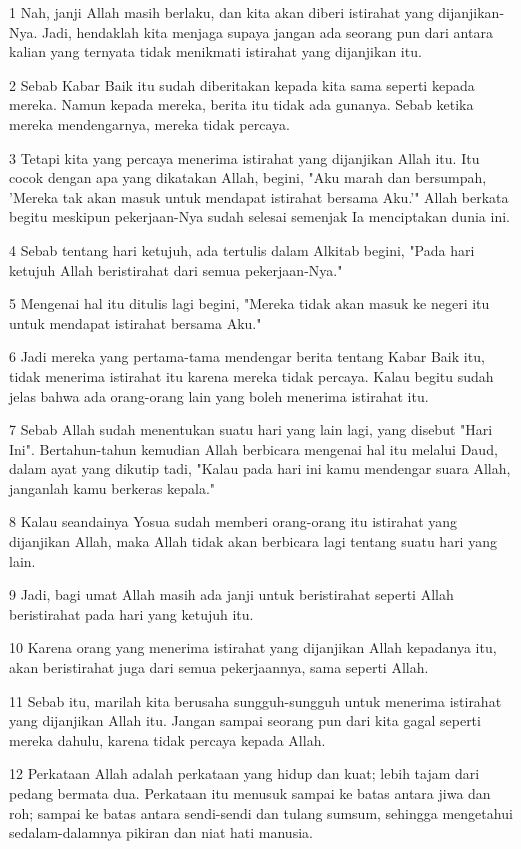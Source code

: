 \par 1 Nah, janji Allah masih berlaku, dan kita akan diberi istirahat yang dijanjikan-Nya. Jadi, hendaklah kita menjaga supaya jangan ada seorang pun dari antara kalian yang ternyata tidak menikmati istirahat yang dijanjikan itu.
\par 2 Sebab Kabar Baik itu sudah diberitakan kepada kita sama seperti kepada mereka. Namun kepada mereka, berita itu tidak ada gunanya. Sebab ketika mereka mendengarnya, mereka tidak percaya.
\par 3 Tetapi kita yang percaya menerima istirahat yang dijanjikan Allah itu. Itu cocok dengan apa yang dikatakan Allah, begini, "Aku marah dan bersumpah, 'Mereka tak akan masuk untuk mendapat istirahat bersama Aku.'" Allah berkata begitu meskipun pekerjaan-Nya sudah selesai semenjak Ia menciptakan dunia ini.
\par 4 Sebab tentang hari ketujuh, ada tertulis dalam Alkitab begini, "Pada hari ketujuh Allah beristirahat dari semua pekerjaan-Nya."
\par 5 Mengenai hal itu ditulis lagi begini, "Mereka tidak akan masuk ke negeri itu untuk mendapat istirahat bersama Aku."
\par 6 Jadi mereka yang pertama-tama mendengar berita tentang Kabar Baik itu, tidak menerima istirahat itu karena mereka tidak percaya. Kalau begitu sudah jelas bahwa ada orang-orang lain yang boleh menerima istirahat itu.
\par 7 Sebab Allah sudah menentukan suatu hari yang lain lagi, yang disebut "Hari Ini". Bertahun-tahun kemudian Allah berbicara mengenai hal itu melalui Daud, dalam ayat yang dikutip tadi, "Kalau pada hari ini kamu mendengar suara Allah, janganlah kamu berkeras kepala."
\par 8 Kalau seandainya Yosua sudah memberi orang-orang itu istirahat yang dijanjikan Allah, maka Allah tidak akan berbicara lagi tentang suatu hari yang lain.
\par 9 Jadi, bagi umat Allah masih ada janji untuk beristirahat seperti Allah beristirahat pada hari yang ketujuh itu.
\par 10 Karena orang yang menerima istirahat yang dijanjikan Allah kepadanya itu, akan beristirahat juga dari semua pekerjaannya, sama seperti Allah.
\par 11 Sebab itu, marilah kita berusaha sungguh-sungguh untuk menerima istirahat yang dijanjikan Allah itu. Jangan sampai seorang pun dari kita gagal seperti mereka dahulu, karena tidak percaya kepada Allah.
\par 12 Perkataan Allah adalah perkataan yang hidup dan kuat; lebih tajam dari pedang bermata dua. Perkataan itu menusuk sampai ke batas antara jiwa dan roh; sampai ke batas antara sendi-sendi dan tulang sumsum, sehingga mengetahui sedalam-dalamnya pikiran dan niat hati manusia.
